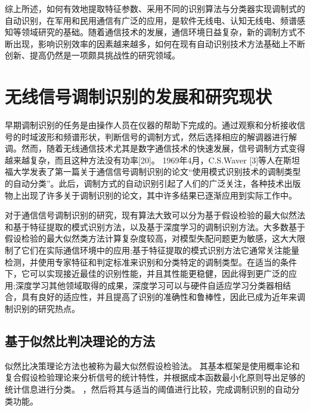 综上所述，如何有效地提取特征参数、采用不同的识别算法与分类器实现调制式的自动识别，在军用和民用通信有广泛的应用，是软件无线电、认知无线电、频谱感知等领域研究的基础。随着通信技术的发展，通信环境日益复杂，新的调制方式不断出现，影响识别效率的因素越来越多，如何在现有自动识别技术方法基础上不断创新、提高仍然是一项颇具挑战性的研究领域。\par


\section{无线信号调制识别的发展和研究现状}

早期调制识别的任务是由操作人员在仪器的帮助下完成的。通过观察和分析接收信号的时域波形和频谱形状，判断信号的调制方式，然后选择相应的解调器进行解调。然而，随着无线通信技术尤其是数字通信技术的快速发展，信号调制方式变得越来越复杂，而且这种方法没有功率[20]。 1969年4月，C.S.Waver [3]等人在斯坦福大学发表了第一篇关于通信信号调制识别的论文“使用模式识别技术的调制类型的自动分类”。此后，调制方式的自动识别引起了人们的广泛关注，各种技术出版物上出现了许多关于调制识别的论文，其中许多结果已逐渐应用到实际工作中。 \par

对于通信信号调制识别的研究，现有算法大致可以分为基于假设检验的最大似然法和基于特征提取的模式识别方法，以及基于深度学习的调制识别方法。大多数基于假设检验的最大似然类方法计算复杂度较高，对模型失配问题更为敏感，这大大限制了它们在实际通信环境中的应用;基于特征提取的模式识别方法它通常关注能量检测，并使用专家特征和判定标准来识别和分类特定的调制类型。在适当的条件下，它可以实现接近最佳的识别性能，并且其性能更稳健，因此得到更广泛的应用;深度学习其他领域取得的成果，深度学习可以与硬件自适应学习分类器相结合，具有良好的适应性，并且提高了识别的准确性和鲁棒性，因此已成为近年来调制识别的研究热点。\par

\subsection{基于似然比判决理论的方法}

似然比决策理论方法也被称为最大似然假设检验法。 其基本框架是使用概率论和复合假设检验理论来分析信号的统计特性，并根据成本函数最小化原则导出足够的统计信息进行分类。 ，然后将其与适当的阈值进行比较，完成调制识别的自动分类功能。\par

